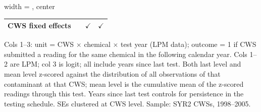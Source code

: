 \begin{table}[htbp]
\begin{adjustbox}{width = \textwidth, center}
\begin{tabular}{lccc}
         CWS fixed effects     &                 & $\checkmark$    & $\checkmark$\\   
         
         \bottomrule
         
      \end{tabular}
      
      
      
   \end{adjustbox}
      {\tiny\linespread{1}\selectfont \par \raggedright 
   Cols 1--3: unit = CWS $\times$ chemical $\times$ test year (LPM data); outcome = 1 if CWS submitted a reading for the same chemical in the following calendar year. Cols 1--2 are LPM; col 3 is logit; all include years since last test. Both last level and mean level z-scored against the distribution of all observations of that contaminant at that CWS; mean level is the cumulative mean of the z-scored readings through this test. Years since last test controls for persistence in the testing schedule. SEs clustered at CWS level. Sample: SYR2 CWSs, 1998--2005.}
   
\end{table}


